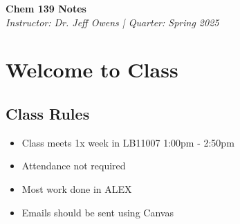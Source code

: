 \documentclass[12pt]{article}
\begin{document}
\begin{center}
    {\LARGE \textbf{Chem 139 Notes}} \\
    \vspace{0.5em}
    {\large \textit{Instructor: Dr. Jeff Owens \quad | \quad Quarter: Spring 2025}} \\
    \vspace{0.5em}
\end{center}

\tableofcontents
\newpage


\section{Welcome to Class}
\subsection{Class Rules}
\begin{itemize}
    \item Class meets 1x week in LB11007 1:00pm - 2:50pm
    \item Attendance not required
    \item Most work done in ALEX
    \item Emails should be sent using Canvas
\end{itemize}
\end{document}
